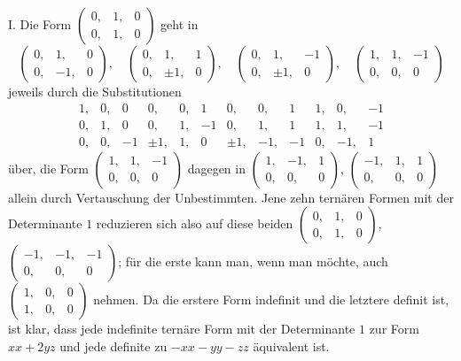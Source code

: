 I. Die Form \(\left(\begin{smallmatrix}0,&1,&0\\0,&1,&0\end{smallmatrix}\right)\) geht in
\[
\left(\begin{smallmatrix}0,&1,&0\\0,&-1,&0\end{smallmatrix}\right),\quad
\left(\begin{smallmatrix}0,&1,&1\\0,&\pm1,&0\end{smallmatrix}\right),\quad
\left(\begin{smallmatrix}0,&1,&-1\\0,&\pm1,&0\end{smallmatrix}\right),\quad
\left(\begin{smallmatrix}1,&1,&-1\\0,&0,&0\end{smallmatrix}\right)
\]
jeweils durch die Substitutionen
\[
\begin{array}{rrr|rrr|rrr|rrr}
1,&0,&0&0,&0,&1&0,&0,&1&1,&0,&-1\\
0,&1,&0&0,&1,&-1&0,&1,&1&1,&1,&-1\\
0,&0,&-1&\pm1,&1,&0&\pm1,&-1,&-1&0,&-1,&1
\end{array}
\]
über, die Form \(\left(\begin{smallmatrix}1,&1,&-1\\0,&0,&0\end{smallmatrix}\right)\) dagegen in \(\left(\begin{smallmatrix}1,&-1,&1\\0,&0,&0\end{smallmatrix}\right)\), \(\left(\begin{smallmatrix}-1,&1,&1\\0,&0,&0\end{smallmatrix}\right)\) allein durch Vertauschung der Unbestimmten. Jene zehn ternären Formen mit der Determinante \(1\) reduzieren sich also auf diese beiden
\(\left(\begin{smallmatrix}0,&1,&0\\0,&1,&0\end{smallmatrix}\right)\), \(\left(\begin{smallmatrix}-1,&-1,&-1\\0,&0,&0\end{smallmatrix}\right)\); für die erste kann man, wenn man möchte, auch \(\left(\begin{smallmatrix}1,&0,&0\\1,&0,&0\end{smallmatrix}\right)\) nehmen. Da die erstere Form indefinit und die letztere definit ist, ist klar, dass jede indefinite ternäre Form mit der Determinante \(1\) zur Form \(xx+2yz\) und jede definite zu \(-xx-yy-zz\) äquivalent ist.

